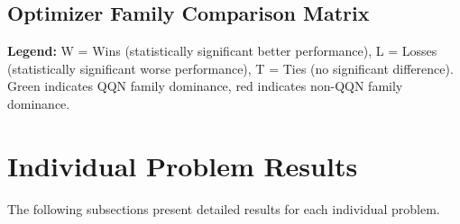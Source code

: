 \documentclass[11pt]{article}
\begin{document}
\subsection{Optimizer Family Comparison Matrix}
\begin{table}[H]
\centering
\caption{Optimizer Family Comparison Matrix}
\label{tab:family_comparison_matrix}
\end{table}
\textbf{Legend:} W = Wins (statistically significant better performance), L = Losses (statistically significant worse performance), T = Ties (no significant difference). Green indicates QQN family dominance, red indicates non-QQN family dominance.

\section{Individual Problem Results}
The following subsections present detailed results for each individual problem.
\end{document}
